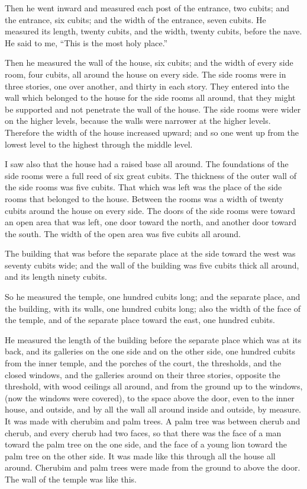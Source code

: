  Then he went inward and measured each post of the
entrance, two cubits; and the entrance, six cubits; and the width of the
entrance, seven cubits.  He measured its length, twenty
cubits, and the width, twenty cubits, before the nave. He said to me,
``This is the most holy place.''

 Then he measured the wall of the house, six cubits; and
the width of every side room, four cubits, all around the house on every
side.  The side rooms were in three stories, one over
another, and thirty in each story. They entered into the wall which
belonged to the house for the side rooms all around, that they might be
supported and not penetrate the wall of the house.  The
side rooms were wider on the higher levels, because the walls were
narrower at the higher levels. Therefore the width of the house
increased upward; and so one went up from the lowest level to the
highest through the middle level.

 I saw also that the house had a raised base all around.
The foundations of the side rooms were a full reed of six great cubits.
 The thickness of the outer wall of the side rooms was
five cubits. That which was left was the place of the side rooms that
belonged to the house.  Between the rooms was a width of
twenty cubits around the house on every side.  The doors
of the side rooms were toward an open area that was left, one door
toward the north, and another door toward the south. The width of the
open area was five cubits all around.

 The building that was before the separate place at the
side toward the west was seventy cubits wide; and the wall of the
building was five cubits thick all around, and its length ninety cubits.

 So he measured the temple, one hundred cubits long; and
the separate place, and the building, with its walls, one hundred cubits
long;  also the width of the face of the temple, and of
the separate place toward the east, one hundred cubits.

 He measured the length of the building before the
separate place which was at its back, and its galleries on the one side
and on the other side, one hundred cubits from the inner temple, and the
porches of the court,  the thresholds, and the closed
windows, and the galleries around on their three stories, opposite the
threshold, with wood ceilings all around, and from the ground up to the
windows, (now the windows were covered),  to the space
above the door, even to the inner house, and outside, and by all the
wall all around inside and outside, by measure.  It was
made with cherubim and palm trees. A palm tree was between cherub and
cherub, and every cherub had two faces,  so that there
was the face of a man toward the palm tree on the one side, and the face
of a young lion toward the palm tree on the other side. It was made like
this through all the house all around.  Cherubim and palm
trees were made from the ground to above the door. The wall of the
temple was like this.


